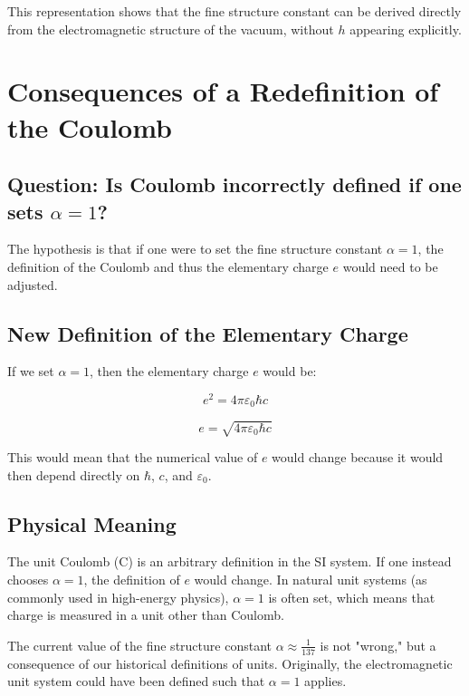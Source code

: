 \documentclass{article}
\begin{document}
	This representation shows that the fine structure constant can be derived directly from the electromagnetic structure of the vacuum, without $h$ appearing explicitly.
	
	\section{Consequences of a Redefinition of the Coulomb}
	
	\subsection{Question: Is Coulomb incorrectly defined if one sets $\alpha = 1$?}
	
	The hypothesis is that if one were to set the fine structure constant $\alpha = 1$, the definition of the Coulomb and thus the elementary charge $e$ would need to be adjusted.
	
	\subsection{New Definition of the Elementary Charge}
	
	If we set $\alpha = 1$, then the elementary charge $e$ would be:
	
	\begin{equation}
		e^2 = 4\pi\varepsilon_0\hbar c
	\end{equation}
	
	\begin{equation}
		e = \sqrt{4\pi\varepsilon_0\hbar c}
	\end{equation}
	
	This would mean that the numerical value of $e$ would change because it would then depend directly on $\hbar$, $c$, and $\varepsilon_0$.
	
	\subsection{Physical Meaning}
	
	The unit Coulomb (C) is an arbitrary definition in the SI system. If one instead chooses $\alpha = 1$, the definition of $e$ would change. In natural unit systems (as commonly used in high-energy physics), $\alpha = 1$ is often set, which means that charge is measured in a unit other than Coulomb.
	
	The current value of the fine structure constant $\alpha \approx \frac{1}{137}$ is not "wrong," but a consequence of our historical definitions of units. Originally, the electromagnetic unit system could have been defined such that $\alpha = 1$ applies.
	
\end{document}
